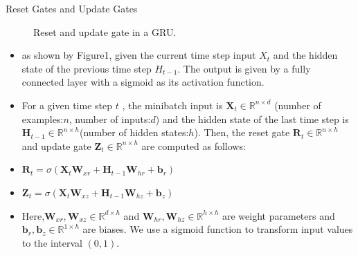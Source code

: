 \begin{vbframe}{Reset Gates and Update Gates}
    \begin{figure}
      \centering
      \caption{\footnotesize{Reset and update gate in a GRU.}}
  \end{figure}
  \begin{itemize}
    \item as shown by Figure1, given the current time step input $X_t$ and the hidden state of the previous time step $H_{t-1}$. The output is given by a fully connected layer with a sigmoid as its activation function.
    \item For a given time step $t$ , the minibatch input is $\mathbf{X}_t \in \mathbb{R}^{n \times d}$ (number of examples:$n$, number of inputs:$d$) and the hidden state of the last time step is $\mathbf{H}_{t-1} \in \mathbb{R}^{n \times h}$(number of hidden states:$h$). Then, the reset gate $\mathbf{R}_t \in \mathbb{R}^{n \times h}$ and update gate $\mathbf{Z}_t \in \mathbb{R}^{n \times h}$ are computed as follows:
   \item $\mathbf{R}_t = \sigma(\mathbf{X}_t \mathbf{W}_{xr} + \mathbf{H}_{t-1} \mathbf{W}_{hr} + \mathbf{b}_r)$
   \item $\mathbf{Z}_t = \sigma(\mathbf{X}_t \mathbf{W}_{xz} + \mathbf{H}_{t-1} \mathbf{W}_{hz} + \mathbf{b}_z)$
    \item Here,$\mathbf{W}_{xr}, \mathbf{W}_{xz} \in \mathbb{R}^{d \times h}$ and $\mathbf{W}_{hr}, \mathbf{W}_{hz} \in \mathbb{R}^{h \times h}$ are weight parameters and $\mathbf{b}_r, \mathbf{b}_z \in \mathbb{R}^{1 \times h}$ are biases. We use a sigmoid function to transform input values to the interval $(0,1)$.
  \end{itemize}
\end{vbframe}


